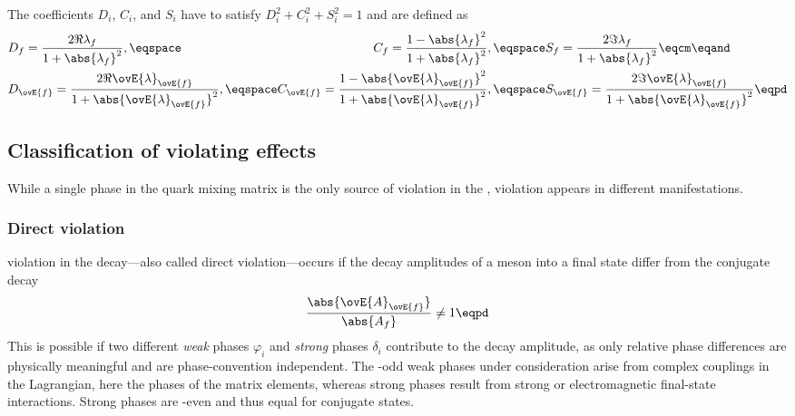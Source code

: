 The \CP coefficients $D_i$, $C_i$, and $S_i$ have to satisfy $D_i^2 + C_i^2 +
S_i^2 = 1$ and are defined as
%
\begin{equation}\label{eq:cpv_theory:flavour_physics:time_evolution:cp_coefficients}
  \begin{alignedat}{2}
    &D_f = \frac{2 \Re \lambda_f}      {1+\abs{\lambda_f}^2},   \eqspace 
    &C_f = \frac{1 - \abs{\lambda_f}^2}{1 + \abs{\lambda_f}^2}, \eqspace 
    &S_f = \frac{2 \Im \lambda_f}      {1+\abs{\lambda_f}^2}    \eqcm \eqand \\
    &D_{\ovE{f}} = \frac{2 \Re \ovE{\lambda}_{\ovE{f}}}      {1+\abs{\ovE{\lambda}_{\ovE{f}}}^2},   \eqspace 
    &C_{\ovE{f}} = \frac{1 - \abs{\ovE{\lambda}_{\ovE{f}}}^2}{1 + \abs{\ovE{\lambda}_{\ovE{f}}}^2}, \eqspace 
    &S_{\ovE{f}} = \frac{2 \Im \ovE{\lambda}_{\ovE{f}}}      {1+\abs{\ovE{\lambda}_{\ovE{f}}}^2}    \eqpd \\
  \end{alignedat}
\end{equation}
%

\subsection[
  head={Classification of \CP violating effects},
  tocentry={Classification of \CPHyperref violating effects}
]{Classification of \CPbfsf violating effects}
\label{sec:cpv_theory:flavour_physics:cpv_classification}

While a single phase in the \CKM quark mixing matrix is the only source of \CP
violation in the \SM, \CP violation appears in different manifestations.

\subsubsection[Direct \CP violation]{Direct \CPbfsf violation}
\label{sec:cpv_theory:flavour_physics:cpv_classification:direct}

\CP violation in the decay---also called direct \CP violation---occurs if the
decay amplitudes of a meson into a final state differ from the \CP conjugate
decay
%
\begin{equation}\label{eq:cpv_theory:flavour_physics:cpv_classification:direct}
  \frac{\abs{\ovE{A}_{\ovE{f}}}}{\abs{A_f}} \neq 1 \eqpd
\end{equation}
%
This is possible if two different \emph{weak} phases $\varphi_i$ and
\emph{strong} phases $\delta_i$ contribute to the decay amplitude, as only
relative phase differences are physically meaningful and are phase-convention
independent. The \CP-odd weak phases under consideration arise from complex
couplings in the Lagrangian, here the phases of the \CKM matrix elements,
whereas strong phases result from strong or electromagnetic final-state
interactions. Strong phases are \CP-even and thus equal for \CP conjugate
states.

